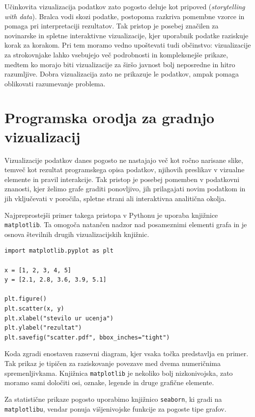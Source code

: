 Učinkovita vizualizacija podatkov zato pogosto deluje kot pripoved (\emph{storytelling with data}). Bralca vodi skozi podatke, postopoma razkriva pomembne vzorce in pomaga pri interpretaciji rezultatov. Tak pristop je posebej značilen za novinarske in spletne interaktivne vizualizacije, kjer uporabnik podatke raziskuje korak za korakom. Pri tem moramo vedno upoštevati tudi občinstvo: vizualizacije za strokovnjake lahko vsebujejo več podrobnosti in kompleksnejše prikaze, medtem ko morajo biti vizualizacije za širšo javnost bolj neposredne in hitro razumljive. Dobra vizualizacija zato ne prikazuje le podatkov, ampak pomaga oblikovati razumevanje problema.


\section{Programska orodja za gradnjo vizualizacij}

Vizualizacije podatkov danes pogosto ne nastajajo več kot ročno narisane slike,
temveč kot rezultat programskega opisa podatkov, njihovih preslikav v vizualne
elemente in pravil interakcije. Tak pristop je posebej pomemben v podatkovni
znanosti, kjer želimo grafe graditi ponovljivo, jih prilagajati novim podatkom
in jih vključevati v poročila, spletne strani ali interaktivna analitična okolja.

Najpreprostejši primer takega pristopa v Pythonu je uporaba knjižnice
\texttt{matplotlib}. Ta omogoča natančen nadzor nad posameznimi elementi grafa
in je osnova številnih drugih vizualizacijskih knjižnic.

\vspace*{3mm}
\begin{lstlisting}
import matplotlib.pyplot as plt

x = [1, 2, 3, 4, 5]
y = [2.1, 2.8, 3.6, 3.9, 5.1]

plt.figure()
plt.scatter(x, y)
plt.xlabel("stevilo ur ucenja")
plt.ylabel("rezultat")
plt.savefig("scatter.pdf", bbox_inches="tight")
\end{lstlisting}

Koda zgradi enostaven razsevni diagram, kjer vsaka točka predstavlja en primer.
Tak prikaz je tipičen za raziskovanje povezave med dvema numeričnima
spremenljivkama. Knjižnica \texttt{matplotlib} je nekoliko bolj nizkonivojska,
zato moramo sami določiti osi, oznake, legende in druge grafične elemente.

Za statistične prikaze pogosto uporabimo knjižnico \texttt{seaborn}, ki gradi na
\texttt{matplotlibu}, vendar ponuja višjenivojske funkcije za pogoste tipe grafov.

